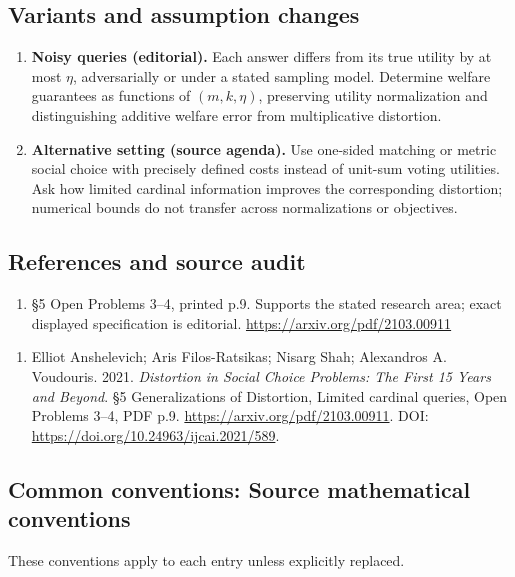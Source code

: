 \documentclass[11pt,a4paper]{article}
\begin{document}
\subsection*{Variants and assumption changes}
\begin{enumerate}
\item \textbf{Noisy queries (editorial).} Each answer differs from its true utility by at most \(\eta\), adversarially or under a stated sampling model. Determine welfare guarantees as functions of \((m,k,\eta)\), preserving utility normalization and distinguishing additive welfare error from multiplicative distortion.
\item \textbf{Alternative setting (source agenda).} Use one-sided matching or metric social choice with precisely defined costs instead of unit-sum voting utilities. Ask how limited cardinal information improves the corresponding distortion; numerical bounds do not transfer across normalizations or objectives.
\end{enumerate}
\subsection*{References and source audit}
\begin{enumerate}
\item §5 Open Problems 3–4, printed p.9. Supports the stated research area; exact displayed specification is editorial. \url{https://arxiv.org/pdf/2103.00911}
\end{enumerate}
\begin{enumerate}\raggedright
\item\hypertarget{definitions:source:30007561:1}{} Elliot Anshelevich; Aris Filos-Ratsikas; Nisarg Shah; Alexandros A. Voudouris. 2021. \emph{Distortion in Social Choice Problems: The First 15 Years and Beyond}. §5 Generalizations of Distortion, Limited cardinal queries, Open Problems 3–4, PDF p.9.
\url{https://arxiv.org/pdf/2103.00911}.
DOI: \url{https://doi.org/10.24963/ijcai.2021/589}.
\end{enumerate}

\subsection*{Common conventions: Source mathematical conventions}

These conventions apply to each entry unless explicitly replaced.
\end{document}
